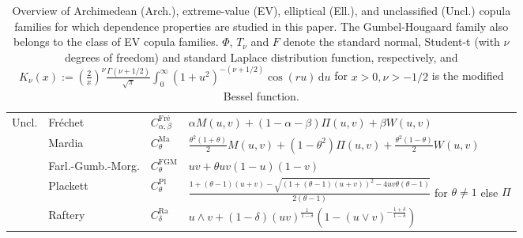 \documentclass{article}
\def\of#1{\left(#1\right)} %
\def\inbrackets#1{\of{#1}} %
\newcommand{\de}{\mathrm{\,d}}
\begin{document}
\begin{table}[tbp]
\begin{center}
{\begin{tabular}{llll}
            \midrule
            Uncl. & Fréchet & $C^{\text{Fré}}_{\alpha, \beta}$ & $\alpha M(u, v)+(1-\alpha-\beta) \Pi(u, v)+\beta W(u, v)$\\
            & Mardia & $C^{\text{Ma}}_{\theta}$ & $\frac{\theta^2(1+\theta)}{2}M(u, v)+(1-\theta^2) \Pi(u, v)+\frac{\theta^2(1-\theta)}{2} W(u, v)$ \\
            & Farl.-Gumb.-Morg. & $C^{\text{FGM}}_{\theta}$ & $uv + \theta u v (1-u)(1-v)$  \\
            & Plackett & $C^{\text{Pl}}_{\theta}$ & $\frac{1+(\theta-1)(u+v) - \sqrt{(1+(\theta-1)(u+v))^2-4 u v \theta(\theta-1)}}{2(\theta-1)}$ for $\theta\neq 1$ else $\Pi$ \\
            & Raftery & $C^{\text{Ra}}_{\delta}$ & $u \wedge v + (1-\delta)(uv)^{\frac1{1-\delta}}\inbrackets{1-(u\vee v)^{-\frac{1+\delta}{1-\delta}}}$\\
            \bottomrule
        \end{tabular}
        }
    \end{center}
    \caption{
        Overview of Archimedean (Arch.), extreme-value (EV), elliptical (Ell.), and unclassified (Uncl.) copula families for which dependence properties are studied in this paper.
        The Gumbel-Hougaard family also belongs to the class of EV copula families.
        \(\Phi\), \(T_\nu\) and \(F\) denote the standard normal, Student-t (with \(\nu\) degrees of freedom) and standard Laplace distribution function, respectively, and
        $K_\nu(x):=\left(\frac{2}{x}\right)^\nu \frac{\Gamma(\nu+1 / 2)}{\sqrt{\pi}} \int_0^{\infty}\left(1+u^2\right)^{-(\nu+1 / 2)} \cos (r u) \de u$ for $x>0,\nu > -1/2$ is the modified Bessel function.
    }
    \label{tab:copulas}
\end{table}
\end{document}

